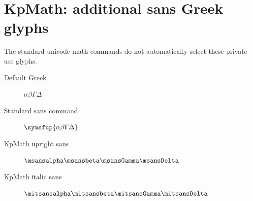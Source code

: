 \documentclass{article}
\begin{document}
\section*{KpMath: additional sans Greek glyphs}
The standard unicode-math commands do not automatically select these private-use glyphs.
\begin{description}
\item[Default Greek] $\alpha\beta\Gamma\Delta$
\item[Standard sans command] $\symsfup{\alpha\beta\Gamma\Delta}$
\item[KpMath upright sans] $\msansalpha\msansbeta\msansGamma\msansDelta$
\item[KpMath italic sans] $\mitsansalpha\mitsansbeta\mitsansGamma\mitsansDelta$
\end{description}
\end{document}
